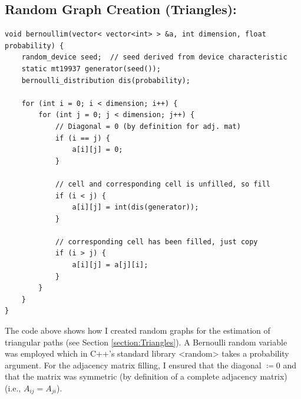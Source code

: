 \documentclass[conference]{styles/acmsiggraph}
\newcommand{\?}{\stackrel{?}{=}}
\begin{document}
\subsection{Random Graph Creation (Triangles):}
\begin{verbatim}
void bernoullim(vector< vector<int> > &a, int dimension, float probability) {
    random_device seed;  // seed derived from device characteristic
    static mt19937 generator(seed());
    bernoulli_distribution dis(probability);

    for (int i = 0; i < dimension; i++) {
        for (int j = 0; j < dimension; j++) {
            // Diagonal = 0 (by definition for adj. mat)
            if (i == j) {
                a[i][j] = 0;
            }

            // cell and corresponding cell is unfilled, so fill
            if (i < j) {
                a[i][j] = int(dis(generator));
            }

            // corresponding cell has been filled, just copy
            if (i > j) {
                a[i][j] = a[j][i];
            }
        }
    }
}

\end{verbatim}

The code above shows how I created random graphs for the estimation of triangular paths (see Section \ref{section:Triangles}).  A Bernoulli random variable was employed which in C++'s standard library <random> takes a probability argument.  For the adjacency matrix filling, I ensured that the diagonal $\coloneq 0$ and that the matrix was symmetric (by definition of a complete adjacency matrix) (i.e., $A_{ij} = A_{ji}$).
\end{document}
